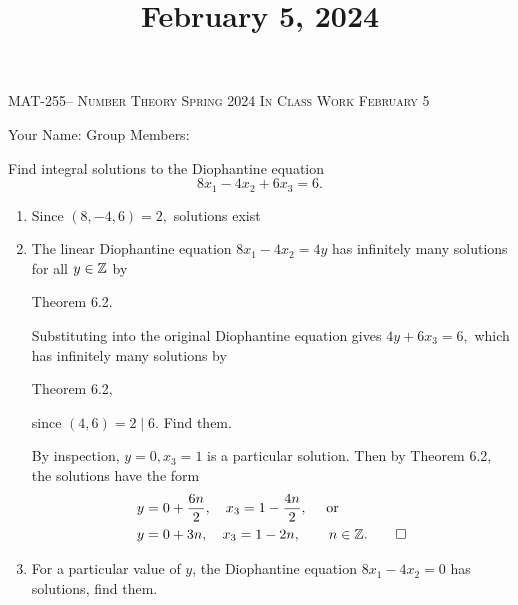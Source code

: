 \documentclass[handout]{ximera}
\title{February 5, 2024}
\begin{document}
\handoutAbstract
\maketitle
  \begin{center}%
    {\large \scshape MAT-255-- Number Theory \hfill Spring 2024 \hfill In Class Work February 5}%
    
    {\large
        Your Name: \hrulefill \quad Group Members:\hrulefill \quad \hrulefill
	\par}%
  \end{center}%
  
\begin{br}
    Find integral solutions to the Diophantine equation \[8x_1-4x_2+6x_3=6.\]
    
    \begin{enumerate}
        \item Since $(8,-4,6)=2,$ solutions exist
        \item The linear Diophantine equation $8x_1-4x_2=4y$ has infinitely many solutions for all $y\in\mathbb Z$ by 
        \begin{freeResponse}
            Theorem 6.2.
        \end{freeResponse}
        \pdfOnly{\ifhandout{
            \rule{2 cm}{0.4pt}}
                \else
                \fi}
        Substituting into the original Diophantine equation gives $4y+6x_3=6,$ which has infinitely many solutions by 
        \begin{freeResponse}
            Theorem 6.2,
        \end{freeResponse}
        \pdfOnly{\ifhandout{
            \rule{2 cm}{0.4pt}}
                \else
                \fi}
        since $(4,6)=2\mid 6$. Find them.
         
        \begin{solution}
            By inspection, $y=0,x_3=1$ is a particular solution. Then by Theorem 6.2, the solutions have the form 
            \begin{align*}
                y&=0+\frac{6n}{2},\quad x_3=1-\frac{4n}{2}, \quad \textnormal{ or }\\
                y&=0+3n,\quad x_3=1-2n, \qquad n\in\mathbb Z. \qedhere
            \end{align*}
        \end{solution}
        \item  For a particular value of $y$, the Diophantine equation $8x_1-4x_2=0$ has solutions, find them. 
        

\end{enumerate}
\end{br}
\end{document}
